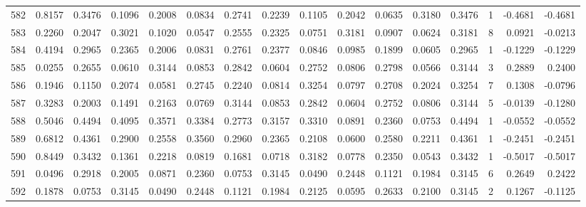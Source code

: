 \begin{tabular}{lrrrrrrrrrrrrrrr}
582 &      0.8157 &  0.3476 &  0.1096 &  0.2008 &  0.0834 &  0.2741 &  0.2239 &  0.1105 &  0.2042 &  0.0635 &   0.3180 &     0.3476 &      1 &                   -0.4681 &                    -0.4681 \\
583 &      0.2260 &  0.2047 &  0.3021 &  0.1020 &  0.0547 &  0.2555 &  0.2325 &  0.0751 &  0.3181 &  0.0907 &   0.0624 &     0.3181 &      8 &                    0.0921 &                    -0.0213 \\
584 &      0.4194 &  0.2965 &  0.2365 &  0.2006 &  0.0831 &  0.2761 &  0.2377 &  0.0846 &  0.0985 &  0.1899 &   0.0605 &     0.2965 &      1 &                   -0.1229 &                    -0.1229 \\
585 &      0.0255 &  0.2655 &  0.0610 &  0.3144 &  0.0853 &  0.2842 &  0.0604 &  0.2752 &  0.0806 &  0.2798 &   0.0566 &     0.3144 &      3 &                    0.2889 &                     0.2400 \\
586 &      0.1946 &  0.1150 &  0.2074 &  0.0581 &  0.2745 &  0.2240 &  0.0814 &  0.3254 &  0.0797 &  0.2708 &   0.2024 &     0.3254 &      7 &                    0.1308 &                    -0.0796 \\
587 &      0.3283 &  0.2003 &  0.1491 &  0.2163 &  0.0769 &  0.3144 &  0.0853 &  0.2842 &  0.0604 &  0.2752 &   0.0806 &     0.3144 &      5 &                   -0.0139 &                    -0.1280 \\
588 &      0.5046 &  0.4494 &  0.4095 &  0.3571 &  0.3384 &  0.2773 &  0.3157 &  0.3310 &  0.0891 &  0.2360 &   0.0753 &     0.4494 &      1 &                   -0.0552 &                    -0.0552 \\
589 &      0.6812 &  0.4361 &  0.2900 &  0.2558 &  0.3560 &  0.2960 &  0.2365 &  0.2108 &  0.0600 &  0.2580 &   0.2211 &     0.4361 &      1 &                   -0.2451 &                    -0.2451 \\
590 &      0.8449 &  0.3432 &  0.1361 &  0.2218 &  0.0819 &  0.1681 &  0.0718 &  0.3182 &  0.0778 &  0.2350 &   0.0543 &     0.3432 &      1 &                   -0.5017 &                    -0.5017 \\
591 &      0.0496 &  0.2918 &  0.2005 &  0.0871 &  0.2360 &  0.0753 &  0.3145 &  0.0490 &  0.2448 &  0.1121 &   0.1984 &     0.3145 &      6 &                    0.2649 &                     0.2422 \\
592 &      0.1878 &  0.0753 &  0.3145 &  0.0490 &  0.2448 &  0.1121 &  0.1984 &  0.2125 &  0.0595 &  0.2633 &   0.2100 &     0.3145 &      2 &                    0.1267 &                    -0.1125 \\

\end{tabular}
